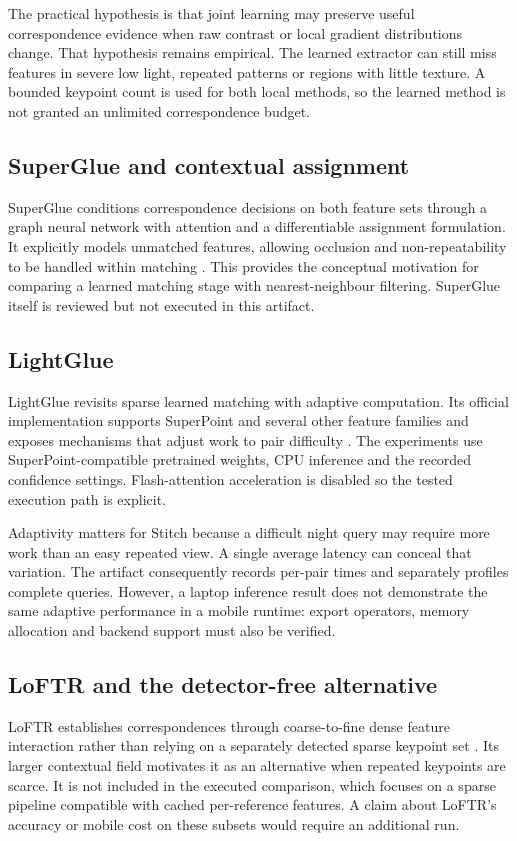 The practical hypothesis is that joint learning may preserve useful correspondence evidence when raw contrast or local gradient distributions change. That hypothesis remains empirical. The learned extractor can still miss features in severe low light, repeated patterns or regions with little texture. A bounded keypoint count is used for both local methods, so the learned method is not granted an unlimited correspondence budget.

\ifFullReport
\subsection{SuperGlue and contextual assignment}
SuperGlue conditions correspondence decisions on both feature sets through a graph neural network with attention and a differentiable assignment formulation. It explicitly models unmatched features, allowing occlusion and non-repeatability to be handled within matching \citep{sarlin2020}. This provides the conceptual motivation for comparing a learned matching stage with nearest-neighbour filtering. SuperGlue itself is reviewed but not executed in this artifact.
\fi

\subsection{LightGlue}
LightGlue revisits sparse learned matching with adaptive computation. Its official implementation supports SuperPoint and several other feature families and exposes mechanisms that adjust work to pair difficulty \citep{lindenberger2023,lightgluerepo}. The experiments use SuperPoint-compatible pretrained weights, CPU inference and the recorded confidence settings. Flash-attention acceleration is disabled so the tested execution path is explicit.

Adaptivity matters for Stitch because a difficult night query may require more work than an easy repeated view. A single average latency can conceal that variation. The artifact consequently records per-pair times and separately profiles complete queries. However, a laptop inference result does not demonstrate the same adaptive performance in a mobile runtime: export operators, memory allocation and backend support must also be verified.

\ifFullReport
\subsection{LoFTR and the detector-free alternative}
LoFTR establishes correspondences through coarse-to-fine dense feature interaction rather than relying on a separately detected sparse keypoint set \citep{sun2021}. Its larger contextual field motivates it as an alternative when repeated keypoints are scarce. It is not included in the executed comparison, which focuses on a sparse pipeline compatible with cached per-reference features. A claim about LoFTR's accuracy or mobile cost on these subsets would require an additional run.
\fi

